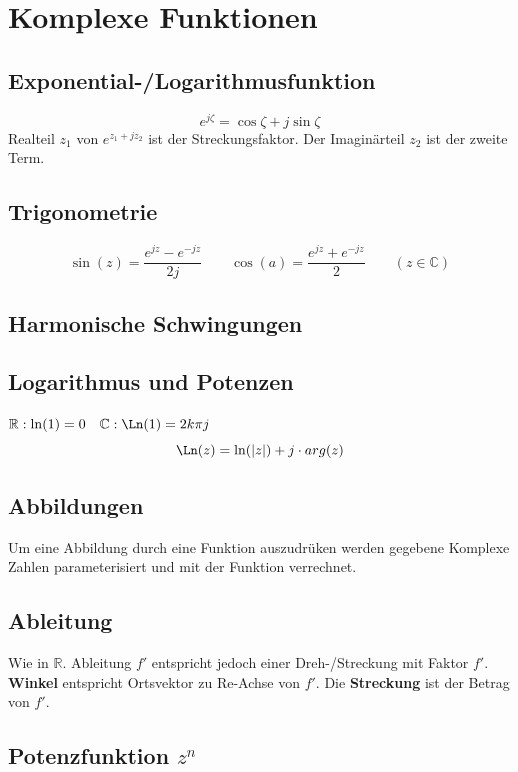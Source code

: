\section{Komplexe Funktionen}
\subsection{Exponential-/Logarithmusfunktion}
\[e^{j\zeta}=\cos\zeta + j\sin\zeta\]
Realteil $z_1$ von $e^{z_1+jz_2}$ ist der Streckungsfaktor. Der Imaginärteil $z_2$ ist der zweite Term.

\subsection{Trigonometrie}
\[\sin(z) = \frac{e^{jz} -e^{-jz}}{2j} \qquad \cos(a) = \frac{e^{jz} +e^{-jz}}{2} \qquad (z \in \mathbb{C})\]

\subsection{Harmonische Schwingungen}

\subsection{Logarithmus und Potenzen}
$\mathbb{R}: \ln(1) = 0 \quad \mathbb{C}: \Ln(1)= 2k\pi j$
\[\Ln(z) = \ln(\left|z\right|) + j\cdot arg(z) \]

\subsection{Abbildungen}
Um eine Abbildung durch eine Funktion auszudrüken werden gegebene Komplexe Zahlen parameterisiert und mit der Funktion verrechnet.

\subsection{Ableitung}
Wie in $\mathbb{R}$. Ableitung $f'$ entspricht jedoch einer Dreh-/Streckung mit Faktor $f'$. \textbf{Winkel} entspricht Ortsvektor zu Re-Achse von $f'$. Die \textbf{Streckung} ist der Betrag von $f'$.

\subsection{Potenzfunktion $z^n$}
\todo{}

